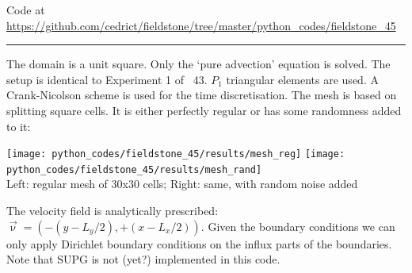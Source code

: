 
%

\begin{center}
\inpython
Code at \url{https://github.com/cedrict/fieldstone/tree/master/python_codes/fieldstone_45}
\end{center}

\par\noindent\rule{\textwidth}{0.4pt}


The domain is a unit square. Only the `pure advection' equation is solved. 
The setup is identical to Experiment 1 of \stone~43. 
$P_1$ triangular elements are used. A Crank-Nicolson scheme is used for the time
discretisation. The mesh is based on splitting square cells. It is either  
perfectly regular or has some randomness added to it:

\begin{center}
\texttt{[image: python\_codes/fieldstone\_45/results/mesh\_reg]}
\texttt{[image: python\_codes/fieldstone\_45/results/mesh\_rand]}\\
{\captionfont Left: regular mesh of 30x30 cells; Right: same, with random noise added}
\end{center}

The velocity field is analytically prescribed: $\vec\upnu=(-(y-L_y/2),+(x-L_x/2))$.
Given the boundary conditions we can only apply Dirichlet boundary conditions 
on the influx parts of the boundaries.
Note that SUPG is not (yet?) implemented in this code.
 
